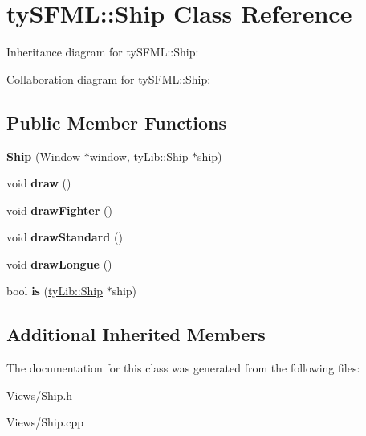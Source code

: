 \hypertarget{classty_s_f_m_l_1_1_ship}{}\section{ty\+S\+F\+M\+L\+:\+:Ship Class Reference}
\label{classty_s_f_m_l_1_1_ship}


Inheritance diagram for ty\+S\+F\+M\+L\+:\+:Ship\+:


Collaboration diagram for ty\+S\+F\+M\+L\+:\+:Ship\+:
\subsection*{Public Member Functions}
\begin{DoxyCompactItemize}
\item 
\hypertarget{classty_s_f_m_l_1_1_ship_a3d55fcdd6f718b8d1b82c22e9f8f9140}{}{\bfseries Ship} (\hyperlink{classty_s_f_m_l_1_1_window}{Window} $\ast$window, \hyperlink{classty_lib_1_1_ship}{ty\+Lib\+::\+Ship} $\ast$ship)\label{classty_s_f_m_l_1_1_ship_a3d55fcdd6f718b8d1b82c22e9f8f9140}

\item 
\hypertarget{classty_s_f_m_l_1_1_ship_ae66edf99e106b6b05867aff6bc154b72}{}void {\bfseries draw} ()\label{classty_s_f_m_l_1_1_ship_ae66edf99e106b6b05867aff6bc154b72}

\item 
\hypertarget{classty_s_f_m_l_1_1_ship_a568d30713e569e96b6bde8ac2799d9cd}{}void {\bfseries draw\+Fighter} ()\label{classty_s_f_m_l_1_1_ship_a568d30713e569e96b6bde8ac2799d9cd}

\item 
\hypertarget{classty_s_f_m_l_1_1_ship_a3e0d2cb09059fbd50238c2c979831aba}{}void {\bfseries draw\+Standard} ()\label{classty_s_f_m_l_1_1_ship_a3e0d2cb09059fbd50238c2c979831aba}

\item 
\hypertarget{classty_s_f_m_l_1_1_ship_a10b9fc5459c13855418a1c67b3e083f1}{}void {\bfseries draw\+Longue} ()\label{classty_s_f_m_l_1_1_ship_a10b9fc5459c13855418a1c67b3e083f1}

\item 
\hypertarget{classty_s_f_m_l_1_1_ship_a34f1a343e4b705f704a3c23a9e49280d}{}bool {\bfseries is} (\hyperlink{classty_lib_1_1_ship}{ty\+Lib\+::\+Ship} $\ast$ship)\label{classty_s_f_m_l_1_1_ship_a34f1a343e4b705f704a3c23a9e49280d}

\end{DoxyCompactItemize}
\subsection*{Additional Inherited Members}


The documentation for this class was generated from the following files\+:\begin{DoxyCompactItemize}
\item 
Views/Ship.\+h\item 
Views/Ship.\+cpp\end{DoxyCompactItemize}
